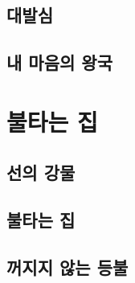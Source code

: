 \documentclass[12pt, a4paper, oneside]{book}
\let\stdsection\section
\renewcommand\section{\newpage\stdsection}
\begin{document}
%										
	\section{ 대발심 }


%										
	\section{ 내 마음의 왕국 }


%										
	\chapter{ 불타는 집}

%										
	\section{ 선의 강물 }

%										
	\section{ 불타는 집 }

%										
	\section{ 꺼지지 않는 등불 }



%										
\end{document}
